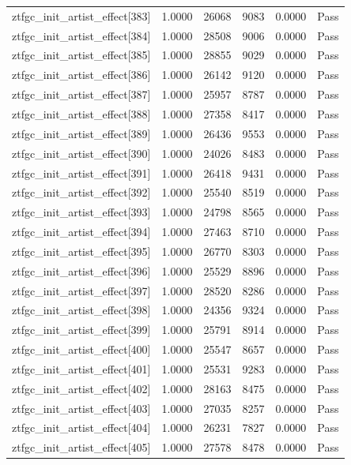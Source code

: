 \begin{table}[htbp]
\begin{tabular}{llrrll}
ztfgc\_init\_artist\_effect[383] & 1.0000 & 26068 & 9083 & 0.0000 & Pass \\
ztfgc\_init\_artist\_effect[384] & 1.0000 & 28508 & 9006 & 0.0000 & Pass \\
ztfgc\_init\_artist\_effect[385] & 1.0000 & 28855 & 9029 & 0.0000 & Pass \\
ztfgc\_init\_artist\_effect[386] & 1.0000 & 26142 & 9120 & 0.0000 & Pass \\
ztfgc\_init\_artist\_effect[387] & 1.0000 & 25957 & 8787 & 0.0000 & Pass \\
ztfgc\_init\_artist\_effect[388] & 1.0000 & 27358 & 8417 & 0.0000 & Pass \\
ztfgc\_init\_artist\_effect[389] & 1.0000 & 26436 & 9553 & 0.0000 & Pass \\
ztfgc\_init\_artist\_effect[390] & 1.0000 & 24026 & 8483 & 0.0000 & Pass \\
ztfgc\_init\_artist\_effect[391] & 1.0000 & 26418 & 9431 & 0.0000 & Pass \\
ztfgc\_init\_artist\_effect[392] & 1.0000 & 25540 & 8519 & 0.0000 & Pass \\
ztfgc\_init\_artist\_effect[393] & 1.0000 & 24798 & 8565 & 0.0000 & Pass \\
ztfgc\_init\_artist\_effect[394] & 1.0000 & 27463 & 8710 & 0.0000 & Pass \\
ztfgc\_init\_artist\_effect[395] & 1.0000 & 26770 & 8303 & 0.0000 & Pass \\
ztfgc\_init\_artist\_effect[396] & 1.0000 & 25529 & 8896 & 0.0000 & Pass \\
ztfgc\_init\_artist\_effect[397] & 1.0000 & 28520 & 8286 & 0.0000 & Pass \\
ztfgc\_init\_artist\_effect[398] & 1.0000 & 24356 & 9324 & 0.0000 & Pass \\
ztfgc\_init\_artist\_effect[399] & 1.0000 & 25791 & 8914 & 0.0000 & Pass \\
ztfgc\_init\_artist\_effect[400] & 1.0000 & 25547 & 8657 & 0.0000 & Pass \\
ztfgc\_init\_artist\_effect[401] & 1.0000 & 25531 & 9283 & 0.0000 & Pass \\
ztfgc\_init\_artist\_effect[402] & 1.0000 & 28163 & 8475 & 0.0000 & Pass \\
ztfgc\_init\_artist\_effect[403] & 1.0000 & 27035 & 8257 & 0.0000 & Pass \\
ztfgc\_init\_artist\_effect[404] & 1.0000 & 26231 & 7827 & 0.0000 & Pass \\
ztfgc\_init\_artist\_effect[405] & 1.0000 & 27578 & 8478 & 0.0000 & Pass \\

\end{tabular}
\end{table}
